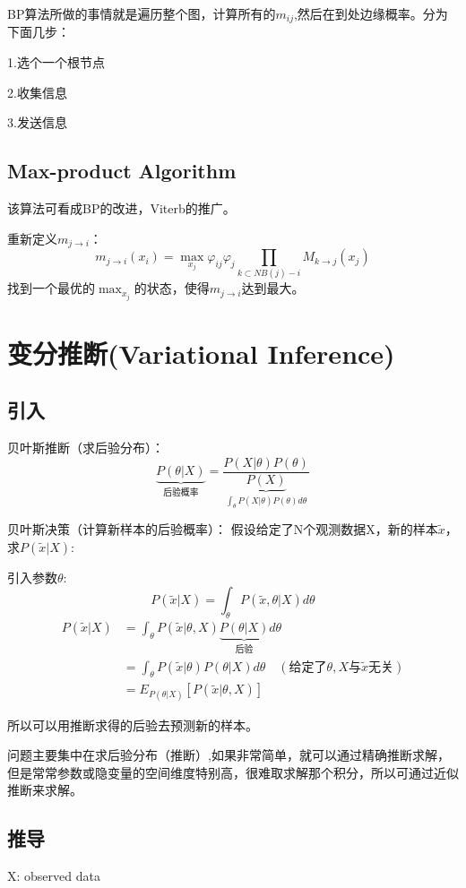 \documentclass[UTF8]{ctexart} %
\begin{document}
			BP算法所做的事情就是遍历整个图，计算所有的$m_{ij}$,然后在到处边缘概率。分为下面几步：
			
			1.选个一个根节点
			
			2.收集信息
			
			3.发送信息
		\subsection{Max-product Algorithm}
			该算法可看成BP的改进，Viterb的推广。
			
			重新定义$m_{j\rightarrow i}$：
			\[m_{j\rightarrow i}(x_i) = \max_{x_j}\varphi_{ij}\varphi_j \prod_{k\subset NB(j)-i}M_{k\rightarrow j}(x_j)\]
			找到一个最优的$\max_{x_j}$的状态，使得$m_{j\rightarrow i}$达到最大。
			\\
		\section{变分推断(Variational Inference)}
			\subsection{引入}
				贝叶斯推断（求后验分布）：
				\[\underbrace{P(\theta|X)}_{\text{后验概率}} = \frac{P(X|\theta)P(\theta)}{\underbrace{P(X)}_{\int _\theta P(X|\theta)P(\theta)d\theta}}\]
				
				贝叶斯决策（计算新样本的后验概率）：
				假设给定了N个观测数据X，新的样本$\tilde{x}$，求$P(\tilde{x}|X)$:
				
				引入参数$\theta$:
				\[P(\tilde{x}|X) = \int_{\theta}P(\tilde{x},\theta|X)d\theta\]
				\[\begin{aligned}
				P(\tilde{x}|X) &= \int_{\theta}P(\tilde{x}|\theta,X)\underbrace{P(\theta|X)}_{\text{后验}}d\theta\\
				&= \int_{\theta}P(\tilde{x}|\theta)P(\theta|X)d\theta \quad (\text{给定了}\theta,X\text{与}\tilde{x}\text{无关})\\
				&=E_{P(\theta|X)}[P(\tilde{x}|\theta,X)]
				\end{aligned}			
				\]
				
				所以可以用推断求得的后验去预测新的样本。
				
				问题主要集中在求后验分布（推断）,如果非常简单，就可以通过精确推断求解，但是常常参数或隐变量的空间维度特别高，很难取求解那个积分，所以可通过近似推断来求解。
			\subsection{推导}
				X: observed data
				
\end{document}
